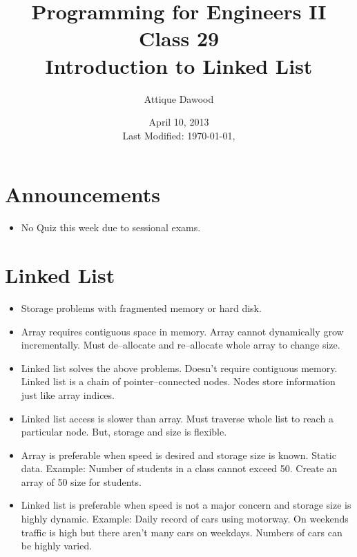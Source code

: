 \documentclass[12pt,a4paper]{article}
\title{\vspace{-2cm}Programming for Engineers II\\Class 29\\Introduction to Linked List}
\author{Attique Dawood}
\date{April 10, 2013\\[0.2cm] Last Modified: \today, \currenttime}
\begin{document}
\maketitle
\section{Announcements}
\begin{itemize}
\item No Quiz this week due to sessional exams.
\end{itemize}
\section{Linked List}
\begin{itemize}
\item Storage problems with fragmented memory or hard disk.
\item Array requires contiguous space in memory. Array cannot dynamically grow incrementally. Must de--allocate and re--allocate whole array to change size.
\item Linked list solves the above problems. Doesn't require contiguous memory. Linked list is a chain of pointer--connected nodes. Nodes store information just like array indices.
\item Linked list access is slower than array. Must traverse whole list to reach a particular node. But, storage and size is flexible.
\item Array is preferable when speed is desired and storage size is known. Static data. Example: Number of students in a class cannot exceed 50. Create an array of 50 size for students.
\item Linked list is preferable when speed is not a major concern and storage size is highly dynamic. Example: Daily record of cars using motorway. On weekends traffic is high but there aren't many cars on weekdays. Numbers of cars can be highly varied.
\end{itemize}
\end{document}
